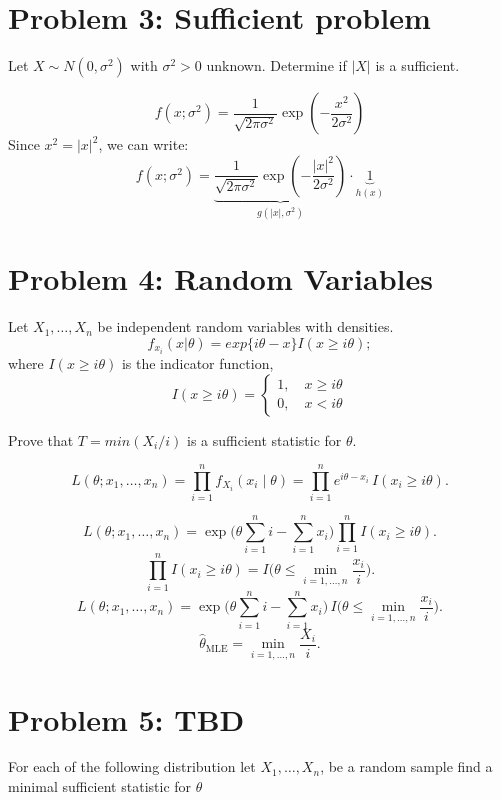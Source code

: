 \documentclass{article}
\begin{document}
\section*{Problem 3: Sufficient problem}

Let $X \sim N(0,\sigma^2)$ with $\sigma^2 > 0$ unknown. Determine if $|X|$ is a sufficient.

\[
	f(x; \sigma^2) = \frac{1}{\sqrt{2\pi\sigma^2}} \exp\left( -\frac{x^2}{2\sigma^2} \right)
\]
Since $x^2 = |x|^2$, we can write:
\[
	f(x; \sigma^2) = \underbrace{\frac{1}{\sqrt{2\pi\sigma^2}} \exp\left( -\frac{|x|^2}{2\sigma^2} \right)}_{g(|x|, \sigma^2)} \cdot \underbrace{1}_{h(x)}
\]
\section*{Problem 4: Random Variables}

Let $X_1, \ldots, X_n$ be independent random variables with densities.
$$
	f_{x_i}(x|\theta) = exp\{i\theta - x\} I(x \geq i\theta);
$$
where $I(x \geq i \theta)$ is the indicator function,
$$ I(x \geq i \theta) = \begin{cases}
		1, \quad x \geq i\theta \\
		0, \quad x < i\theta
	\end{cases}
$$

Prove that $T = min(X_i /i )$ is a sufficient statistic for $\theta$.


\[
	L(\theta; x_1, \dots, x_n) = \prod_{i=1}^n f_{X_i}(x_i \mid \theta)
	= \prod_{i=1}^n e^{i \theta - x_i} \, I(x_i \ge i \theta).
\]

\[
	L(\theta; x_1, \dots, x_n) = \exp\Bigg(\theta \sum_{i=1}^n i - \sum_{i=1}^n x_i \Bigg) \prod_{i=1}^n I(x_i \ge i \theta).
\]
\[
	\prod_{i=1}^n I(x_i \ge i \theta) = I\Bigg(\theta \le \min_{i=1,\dots,n} \frac{x_i}{i} \Bigg).
\]
\[
	L(\theta; x_1, \dots, x_n) = \exp\Bigg(\theta \sum_{i=1}^n i - \sum_{i=1}^n x_i \Bigg) \, I\Bigg(\theta \le \min_{i=1,\dots,n} \frac{x_i}{i} \Bigg).
\]
\[
	\hat{\theta}_{\mathrm{MLE}} = \min_{i=1,\dots,n} \frac{X_i}{i}.
\]

\section*{Problem 5: TBD}

For each of the following distribution let $X_1, \ldots, X_n$, be a random sample find a minimal
sufficient statistic for $\theta$
\end{document}
